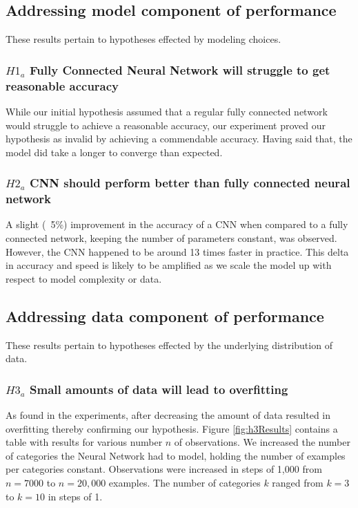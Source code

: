\documentclass[11pt]{article}
\begin{document}
\subsection{Addressing model component of performance}

These results pertain to hypotheses effected by modeling choices.

\subsubsection{$H1_a$\: Fully Connected Neural Network will struggle to
  get reasonable accuracy}

While our initial hypothesis assumed that a regular fully connected
network would struggle to achieve a reasonable accuracy, our experiment
proved our hypothesis as invalid by achieving a commendable accuracy.
Having said that, the model did take a longer to converge than expected. 

\subsubsection{$H2_a$\: CNN should perform better than fully connected neural
  network}

A slight (~5\%) improvement in the accuracy of a CNN when compared to a fully
connected network, keeping the number of parameters constant, was observed.
However, the CNN happened to be around 13 times faster in practice. This
delta in accuracy and speed is likely to be amplified as we scale the model
up with respect to model complexity or data.

\subsection{Addressing data component of performance}

These results pertain to hypotheses effected by the underlying
distribution of data.

\subsubsection{$H3_a$\: Small amounts of data will lead to overfitting}

As found in the experiments, after decreasing the amount of data resulted
in overfitting thereby confirming our hypothesis. Figure \ref{fig:h3Results}
contains a table with results for various number $n$ of observations.
We increased the number of categories the Neural Network had to model,
holding the number of examples per categories constant. Observations were
increased in steps of 1,000 from $n=7000$ to $n=20,000$ examples. The
number of categories $k$ ranged from $k=3$ to $k=10$ in steps of 1.
\end{document}
